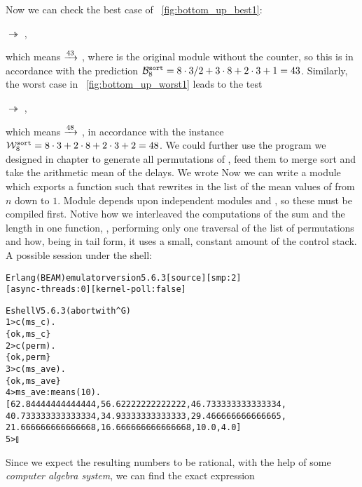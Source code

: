 Now we can check the best case of \fig~\vref{fig:bottom_up_best1}:
\begin{center}
 \(\twoheadrightarrow\) ,
\end{center}
which means 
\(\smashedrightarrow{43}\) \erlcode{[1,2,3,4,5,6,7,8]}, where
 is the original module without the counter, so this is in
accordance with the prediction \(\best{sort}{8} = 8 \cdot 3/2 + 3
\cdot 8 + 2 \cdot 3 + 1 = 43\). Similarly, the worst case in
\fig~\vref{fig:bottom_up_worst1} leads to the test
\begin{center}
 \(\twoheadrightarrow\) ,
\end{center}
which means 
\(\smashedrightarrow{48}\) \erlcode{[1,2,3,4,5,6,7,8]}, in accordance
with the instance \(\worst{sort}{8} = 8 \cdot 3 + 2 \cdot 8 + 2 \cdot
3 + 2 = 48\). We could further use the program we designed in chapter
 to generate all permutations of
\erlcode{[1,2,3,4,5,6,7,8]}, feed them to merge sort and take the
arithmetic mean of the delays. We wrote  Now
we can write a module  which exports a function
 such that  rewrites in the
list of the mean values of  from \(n\) down to
\(1\).   Module  depends
upon independent modules  and , so these
must be compiled first. Notive how we interleaved the computations of
the sum and the length in one function, ,
performing only one traversal of the list of permutations and how,
being in tail form, it uses a small, constant amount of the control
stack. A possible session under the \Erlang shell:
\begin{alltt}
Erlang (BEAM) emulator version 5.6.3 [source] [smp:2]
 [async-threads:0] [kernel-poll:false]

Eshell V5.6.3  (abort with ^G)
1> c(ms_c).
\{ok,ms_c\}
2> c(perm).
\{ok,perm\}
3> c(ms_ave).
\{ok,ms_ave\}
4> ms_ave:means(10).
[62.84444444444444,56.62222222222222,46.733333333333334,
 40.733333333333334,34.93333333333333,29.466666666666665,
 21.666666666666668,16.666666666666668,10.0,4.0]
5> \(\talloblong\)
\end{alltt}
Since we expect the resulting numbers to be rational, with the help of
some \emph{computer algebra system}, we can find the exact expression
